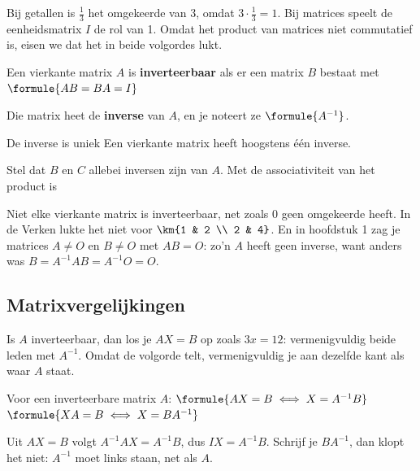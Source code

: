 Bij getallen is $\frac13$ het omgekeerde van 3, omdat $3 \cdot \frac13 = 1$. Bij matrices speelt de eenheidsmatrix $I$ de rol van 1. Omdat het product van matrices niet commutatief is, eisen we dat het in beide volgordes lukt.

\begin{theorie}
Een vierkante matrix $A$ is \textbf{\textcolor{accent}{inverteerbaar}} als er een matrix $B$ bestaat met \quad $\formule{AB = BA = I}$

\vspace{1mm}
Die matrix heet de \textbf{\textcolor{accent}{inverse}} van $A$, en je noteert ze $\formule{A^{-1}}$.

\begin{stelling}{De inverse is uniek}
Een vierkante matrix heeft hoogstens één inverse.
\end{stelling}

\begin{bewijs}
Stel dat $B$ en $C$ allebei inversen zijn van $A$. Met de associativiteit van het product is
\end{bewijs}
\end{theorie}

Niet elke vierkante matrix is inverteerbaar, net zoals 0 geen omgekeerde heeft. In de Verken lukte het niet voor $\km{1 & 2 \\ 2 & 4}$. En in hoofdstuk 1 zag je matrices $A \neq O$ en $B \neq O$ met $AB = O$: zo'n $A$ heeft geen inverse, want anders was $B = A^{-1}AB = A^{-1}O = O$.

\begin{oefeningen}
\end{oefeningen}

\subsection{Matrixvergelijkingen}

Is $A$ inverteerbaar, dan los je $AX = B$ op zoals $3x = 12$: vermenigvuldig beide leden met $A^{-1}$. Omdat de volgorde telt, vermenigvuldig je aan dezelfde kant als waar $A$ staat.

\begin{theorie}
Voor een inverteerbare matrix $A$: \qquad $\formule{AX = B \iff X = A^{-1}B}$ \qquad $\formule{XA = B \iff X = BA^{-1}}$
\end{theorie}

Uit $AX = B$ volgt $A^{-1}AX = A^{-1}B$, dus $IX = A^{-1}B$. Schrijf je $BA^{-1}$, dan klopt het niet: $A^{-1}$ moet links staan, net als $A$.

